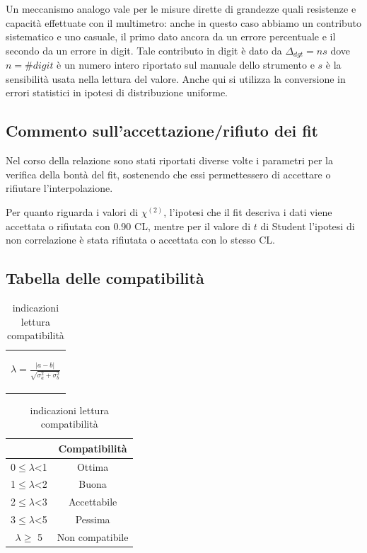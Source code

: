\documentclass{article}
\begin{document}
Un meccanismo analogo vale per le misure dirette di grandezze quali resistenze e capacità effettuate con il multimetro: anche in questo caso abbiamo un contributo sistematico e uno casuale, il primo dato ancora da un errore percentuale e il secondo da un errore in digit. Tale contributo in digit è dato da $\Delta_{dgt}=ns$ dove $n=\#digit$ è un numero intero riportato sul manuale dello strumento e $s$ è la sensibilità usata nella lettura del valore. Anche qui si utilizza la conversione in errori statistici in ipotesi di distribuzione uniforme.

\subsection{Commento sull'accettazione/rifiuto dei fit}
Nel corso della relazione sono stati riportati diverse volte i parametri per la verifica della bontà del fit, sostenendo che essi permettessero di accettare o rifiutare l'interpolazione.


Per quanto riguarda i valori di $\chi^{(2)}$, l'ipotesi che il fit descriva i dati viene accettata o rifiutata con 0.90 CL, mentre
per il valore di $t$ di Student l'ipotesi di non correlazione è stata rifiutata o accettata con lo stesso CL.


\subsection{Tabella delle compatibilità}
\medskip
\begin{table}[H]
    \centering
    \begin{tabular}{c}
        \begin{Large}
        $\lambda=\frac{|a-b|}{\sqrt{\sigma_a^2+\sigma_b^2}}$
        \end{Large}\\
    \end{tabular}
    \hspace{0.5cm}
    \begin{tabular}{cc}
        \toprule
        &       \textbf{Compatibilità   }       \\
        \midrule
        0$\leq \lambda$<1   &Ottima                 \\
        1$\leq \lambda$<2   &Buona                  \\
        2$\leq \lambda$<3   &Accettabile            \\
        3$\leq\lambda$<5   &Pessima                \\
        $ \lambda \geq $  5     &Non compatibile        \\
        \bottomrule
    \end{tabular}
    \caption{indicazioni lettura compatibilità}
    \label{tab:compatibilità}
\end{table}
\end{document}

